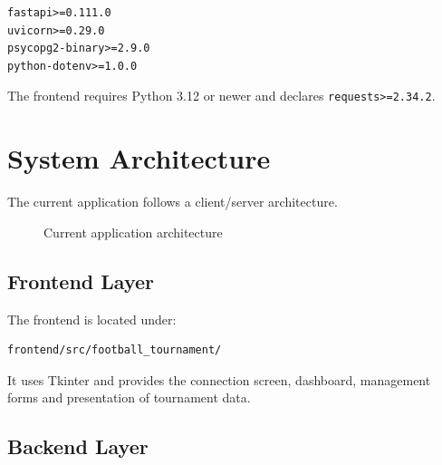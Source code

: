 \documentclass[11pt,a4paper]{article}
\begin{document}
\begin{lstlisting}
fastapi>=0.111.0
uvicorn>=0.29.0
psycopg2-binary>=2.9.0
python-dotenv>=1.0.0
\end{lstlisting}

The frontend requires Python 3.12 or newer and declares
\texttt{requests>=2.34.2}.

\section{System Architecture}

The current application follows a client/server architecture.

\begin{figure}[H]
\centering
{}
\caption{Current application architecture}
\end{figure}

\subsection{Frontend Layer}

The frontend is located under:

\begin{lstlisting}
frontend/src/football_tournament/
\end{lstlisting}

It uses Tkinter and provides the connection screen, dashboard,
management forms and presentation of tournament data.

\subsection{Backend Layer}
\end{document}
